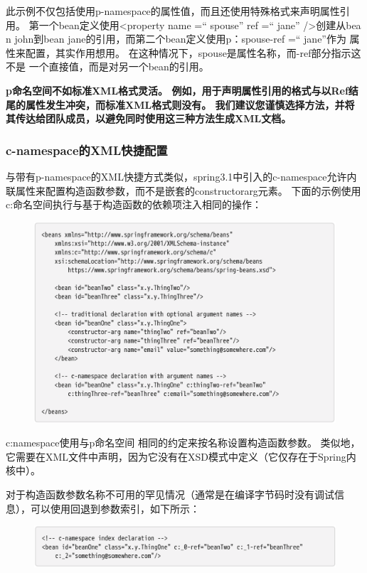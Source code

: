 此示例不仅包括使用p-namespace的属性值，而且还使用特殊格式来声明属性引用。 
第一个bean定义使用<property name =“ spouse” ref =“ jane” />创建从bea
n john到bean jane的引用，而第二个bean定义使用p：spouse-ref =“ jane”作为
属性来配置，其实作用想用。 在这种情况下，spouse是属性名称，而-ref部分指示这不是
一个直接值，而是对另一个bean的引用。

\textbf{p命名空间不如标准XML格式灵活。 例如，用于声明属性引用的格式与以Ref结尾的属性发生冲突，而标准XML格式则没有。 我们建议您谨慎选择方法，并将其传达给团队成员，以避免同时使用这三种方法生成XML文档。}

\subsubsection{c-namespace的XML快捷配置}

与带有p-namespace的XML快捷方式类似，spring3.1中引入的c-namespace允许内联属性来配置构造函数参数，而不是嵌套的constructorarg元素。
\newpage
下面的示例使用c:命名空间执行与基于构造函数的依赖项注入相同的操作：

\begin{figure}[ht]
    \centering
    \includegraphics[width=1\linewidth]{./Figure/IMG_code_52.png}
\end{figure}

c:namespace使用与p命名空间
相同的约定来按名称设置构造函数参数。
类似地，它需要在XML文件中声明，因为它没有在XSD模式中定义（它仅存在于Spring内核中）。


对于构造函数参数名称不可用的罕见情况（通常是在编译字节码时没有调试信息），可以使用回退到参数索引，如下所示：

\begin{figure}[ht]
    \centering
    \includegraphics[width=1\linewidth]{./Figure/IMG_code_53.png}
\end{figure}

